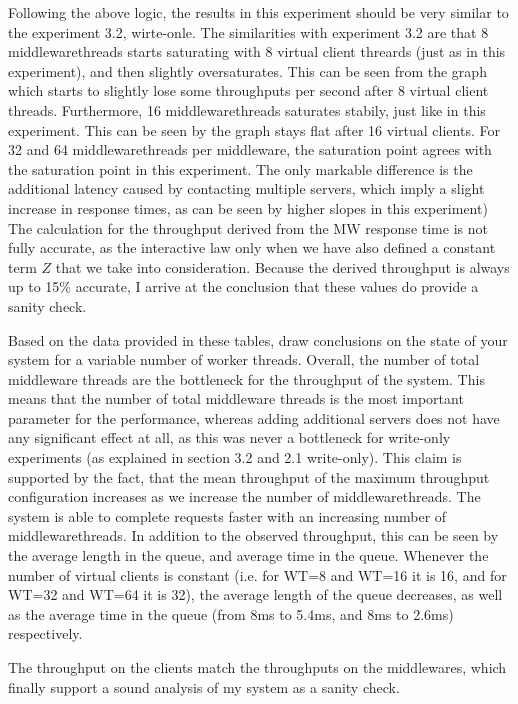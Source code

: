 \documentclass[11pt,a4paper]{article}
\begin{document}
Following the above logic, the results in this experiment should be very similar to the experiment 3.2, wirte-onle.
The similarities with experiment 3.2 are that 8 middlewarethreads starts saturating with 8 virtual client threards (just as in this experiment), and then slightly oversaturates.
This can be seen from the graph which starts to slightly lose some throughputs per second after 8 virtual client threads.
Furthermore, 16 middlewarethreads saturates stabily, just like in this experiment.
This can be seen by the graph stays flat after 16 virtual clients.
For 32 and 64 middlewarethreads per middleware, the saturation point agrees with the saturation point in this experiment.
The only markable difference is the additional latency caused by contacting multiple servers, which imply a slight increase in response times, as can be seen by higher slopes in this experiment)\\

The calculation for the throughput derived from the MW response time is not fully accurate, as the interactive law only when we have also defined a constant term $Z$ that we take into consideration.
Because the derived throughput is always up to 15\% accurate, I arrive at the conclusion that these values do provide a sanity check.

Based on the data provided in these tables, draw conclusions on the state of your system for a variable number of worker threads.
Overall, the number of total middleware threads are the bottleneck for the throughput of the system.
This means that the number of total middleware threads is the most important parameter for the performance, whereas adding additional servers does not have any significant effect at all, as this was never a bottleneck for write-only experiments (as explained in section 3.2 and 2.1 write-only).
This claim is supported by the fact, that the mean throughput of the maximum throughput configuration increases as we increase the number of middlewarethreads.
The system is able to complete requests faster with an increasing number of middlewarethreads.
In addition to the observed throughput, this can be seen by the average length in the queue, and average time in the queue.
Whenever the number of virtual clients is constant (i.e. for WT=8 and WT=16 it is 16, and for WT=32 and WT=64 it is 32), the average length of the queue decreases, as well as the average time in the queue (from 8ms to 5.4ms, and 8ms to 2.6ms) respectively.

The throughput on the clients match the throughputs on the middlewares, which finally support a sound analysis of my system as a sanity check.
\end{document}
